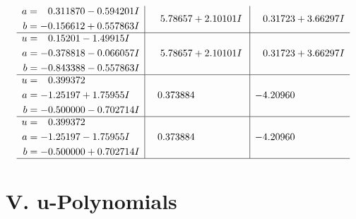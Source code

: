 \documentclass[1p]{elsarticle_modified}
\theoremstyle{definition}
\begin{document}
$$\begin{array}{c|c|c}
\begin{aligned}
a &= \phantom{-}0.311870 - 0.594201 I \\
b &= -0.156612 + 0.557863 I\end{aligned}
 & \phantom{-}5.78657 + 2.10101 I & \phantom{-}0.31723 + 3.66297 I \\ \hline\begin{aligned}
u &= \phantom{-}0.15201 - 1.49915 I \\
a &= -0.378818 - 0.066057 I \\
b &= -0.843388 - 0.557863 I\end{aligned}
 & \phantom{-}5.78657 + 2.10101 I & \phantom{-}0.31723 + 3.66297 I \\ \hline\begin{aligned}
u &= \phantom{-}0.399372\phantom{ +0.000000I} \\
a &= -1.25197 + 1.75955 I \\
b &= -0.500000 - 0.702714 I\end{aligned}
 & \phantom{-}0.373884\phantom{ +0.000000I} & -4.20960\phantom{ +0.000000I} \\ \hline\begin{aligned}
u &= \phantom{-}0.399372\phantom{ +0.000000I} \\
a &= -1.25197 - 1.75955 I \\
b &= -0.500000 + 0.702714 I\end{aligned}
 & \phantom{-}0.373884\phantom{ +0.000000I} & -4.20960\phantom{ +0.000000I}\\
 \hline 
 \end{array}$$\newpage
\newpage\renewcommand{\arraystretch}{1}
\centering \section*{ V. u-Polynomials}
\end{document}
